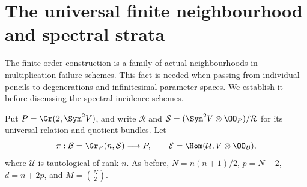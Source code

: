 \section{The universal finite neighbourhood and spectral strata}
\label{sec:relative-spectral-strata}

The finite-order construction is a family of actual neighbourhoods in
multiplication-failure schemes.  This fact is needed when passing from
individual pencils to degenerations and infinitesimal parameter spaces.
We establish it before discussing the spectral incidence schemes.

Put \(P=\Gr(2,\Sym^2V)\), and write \(\mathcal R\) and
\(\mathcal S=(\Sym^2V\otimes\OO_P)/\mathcal R\) for its
universal relation and quotient bundles.  Let
\[
 \pi:\mathcal B=\Gr_P(n,\mathcal S)\longrightarrow P,
 \qquad \mathcal E=\Hom(\mathcal U,V\otimes\OO_{\mathcal B}),
\]
where \(\mathcal U\) is tautological of rank \(n\).  As before,
\(N=n(n+1)/2\), \(p=N-2\), \(d=n+2p\), and
\(M=\binom N2\).

